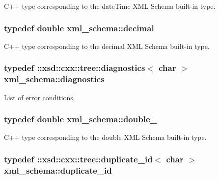 C++ type corresponding to the date\+Time X\+M\+L Schema built-\/in type. 

\hypertarget{namespacexml__schema_a69bfaf24f63a8c18ebd8e21db6b343df}{
\subsubsection[{decimal}]{\setlength{\rightskip}{0pt plus 5cm}typedef double {\bf xml\+\_\+schema\+::decimal}}}\label{namespacexml__schema_a69bfaf24f63a8c18ebd8e21db6b343df}


C++ type corresponding to the decimal X\+M\+L Schema built-\/in type. 

\hypertarget{namespacexml__schema_a62cc106990ec99fdaf2f3364d98cfabd}{
\subsubsection[{diagnostics}]{\setlength{\rightskip}{0pt plus 5cm}typedef \+::xsd\+::cxx\+::tree\+::diagnostics$<$ char $>$ {\bf xml\+\_\+schema\+::diagnostics}}}\label{namespacexml__schema_a62cc106990ec99fdaf2f3364d98cfabd}


List of error conditions. 

\hypertarget{namespacexml__schema_aac2d3d3483d3a20e8d96d2e8e5b3a470}{
\subsubsection[{double\+\_\+}]{\setlength{\rightskip}{0pt plus 5cm}typedef double {\bf xml\+\_\+schema\+::double\+\_\+}}}\label{namespacexml__schema_aac2d3d3483d3a20e8d96d2e8e5b3a470}


C++ type corresponding to the double X\+M\+L Schema built-\/in type. 

\hypertarget{namespacexml__schema_a22a2b3c973b87b06c2868d85a154fd63}{
\subsubsection[{duplicate\+\_\+id}]{\setlength{\rightskip}{0pt plus 5cm}typedef \+::xsd\+::cxx\+::tree\+::duplicate\+\_\+id$<$ char $>$ {\bf xml\+\_\+schema\+::duplicate\+\_\+id}}}\label{namespacexml__schema_a22a2b3c973b87b06c2868d85a154fd63}


